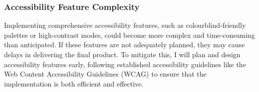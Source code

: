 \documentclass[]{project_plan}
\begin{document}
\subsubsection{Accessibility Feature Complexity}
Implementing comprehensive accessibility features, such as colourblind-friendly palettes or high-contrast modes, could become more complex and time-consuming than anticipated. If these features are not adequately planned, they may cause delays in delivering the final product. To mitigate this, I will plan and design accessibility features early, following established accessibility guidelines like the Web Content Accessibility Guidelines (WCAG) to ensure that the implementation is both efficient and effective.











\end{document}
